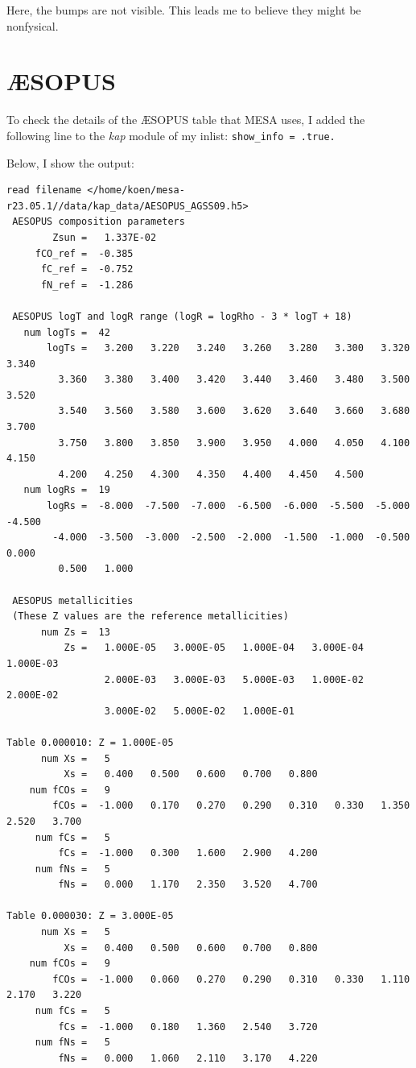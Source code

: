 \documentclass[a4paper,10pt]{article}
\begin{document}
Here, the bumps are not visible. This leads me to believe they might be nonfysical.

\section{\texorpdfstring{\AE}{AE}SOPUS}

To check the details of the \AE SOPUS table that MESA uses,
I added the following line to the \emph{kap} module of my inlist:
\texttt{show_info = .true.}

Below, I show the output:
\begin{verbatim}
read filename </home/koen/mesa-r23.05.1//data/kap_data/AESOPUS_AGSS09.h5>
 AESOPUS composition parameters
        Zsun =   1.337E-02
     fCO_ref =  -0.385
      fC_ref =  -0.752
      fN_ref =  -1.286

 AESOPUS logT and logR range (logR = logRho - 3 * logT + 18)
   num logTs =  42
       logTs =   3.200   3.220   3.240   3.260   3.280   3.300   3.320   3.340
         3.360   3.380   3.400   3.420   3.440   3.460   3.480   3.500   3.520
         3.540   3.560   3.580   3.600   3.620   3.640   3.660   3.680   3.700
         3.750   3.800   3.850   3.900   3.950   4.000   4.050   4.100   4.150
         4.200   4.250   4.300   4.350   4.400   4.450   4.500
   num logRs =  19
       logRs =  -8.000  -7.500  -7.000  -6.500  -6.000  -5.500  -5.000  -4.500
        -4.000  -3.500  -3.000  -2.500  -2.000  -1.500  -1.000  -0.500   0.000
         0.500   1.000

 AESOPUS metallicities
 (These Z values are the reference metallicities)
      num Zs =  13
          Zs =   1.000E-05   3.000E-05   1.000E-04   3.000E-04   1.000E-03
                 2.000E-03   3.000E-03   5.000E-03   1.000E-02   2.000E-02
                 3.000E-02   5.000E-02   1.000E-01

Table 0.000010: Z = 1.000E-05
      num Xs =   5
          Xs =   0.400   0.500   0.600   0.700   0.800
    num fCOs =   9
        fCOs =  -1.000   0.170   0.270   0.290   0.310   0.330   1.350   2.520   3.700
     num fCs =   5
         fCs =  -1.000   0.300   1.600   2.900   4.200
     num fNs =   5
         fNs =   0.000   1.170   2.350   3.520   4.700

Table 0.000030: Z = 3.000E-05
      num Xs =   5
          Xs =   0.400   0.500   0.600   0.700   0.800
    num fCOs =   9
        fCOs =  -1.000   0.060   0.270   0.290   0.310   0.330   1.110   2.170   3.220
     num fCs =   5
         fCs =  -1.000   0.180   1.360   2.540   3.720
     num fNs =   5
         fNs =   0.000   1.060   2.110   3.170   4.220


\end{verbatim}
\end{document}
